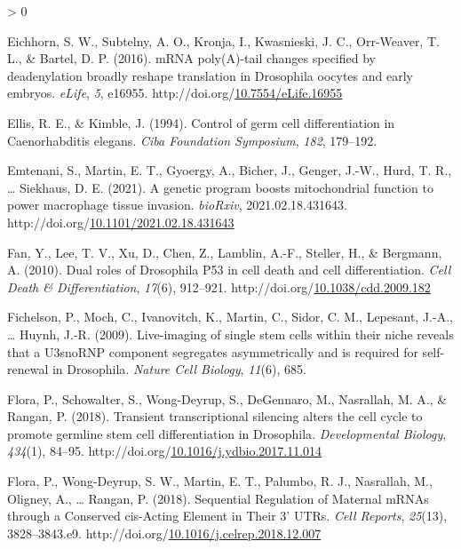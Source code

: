 \documentclass[12pt,oneside]{reedthesis}
\newlength{\cslhangindent}
\newenvironment{CSLReferences}[2] %
 {%
  \setlength{\parindent}{0pt}
  \ifodd #1 \everypar{\setlength{\hangindent}{\cslhangindent}}\ignorespaces\fi
  \ifnum #2 > 0
  \setlength{\parskip}{#2\baselineskip}
  \fi
 }%
 {}
\begin{document}
\begin{CSLReferences}{1}{0}
\leavevmode\hypertarget{ref-Eichhorn2016n}{}%
Eichhorn, S. W., Subtelny, A. O., Kronja, I., Kwasnieski, J. C., Orr-Weaver, T. L., \& Bartel, D. P. (2016). {mRNA} poly({A})-tail changes specified by deadenylation broadly reshape translation in {Drosophila} oocytes and early embryos. \emph{eLife}, \emph{5}, e16955. http://doi.org/\href{https://doi.org/10.7554/eLife.16955}{10.7554/eLife.16955}

\leavevmode\hypertarget{ref-Ellis1994d}{}%
Ellis, R. E., \& Kimble, J. (1994). Control of germ cell differentiation in {Caenorhabditis} elegans. \emph{Ciba Foundation Symposium}, \emph{182}, 179--192.

\leavevmode\hypertarget{ref-emtenaniGeneticProgramBoosts2021}{}%
Emtenani, S., Martin, E. T., Gyoergy, A., Bicher, J., Genger, J.-W., Hurd, T. R., \ldots{} Siekhaus, D. E. (2021). A genetic program boosts mitochondrial function to power macrophage tissue invasion. \emph{bioRxiv}, 2021.02.18.431643. http://doi.org/\href{https://doi.org/10.1101/2021.02.18.431643}{10.1101/2021.02.18.431643}

\leavevmode\hypertarget{ref-fanDualRolesDrosophila2010}{}%
Fan, Y., Lee, T. V., Xu, D., Chen, Z., Lamblin, A.-F., Steller, H., \& Bergmann, A. (2010). Dual roles of {Drosophila} P53 in cell death and cell differentiation. \emph{Cell Death \& Differentiation}, \emph{17}(6), 912--921. http://doi.org/\href{https://doi.org/10.1038/cdd.2009.182}{10.1038/cdd.2009.182}

\leavevmode\hypertarget{ref-Fichelson2009a}{}%
Fichelson, P., Moch, C., Ivanovitch, K., Martin, C., Sidor, C. M., Lepesant, J.-A., \ldots{} Huynh, J.-R. (2009). Live-imaging of single stem cells within their niche reveals that a {U3snoRNP} component segregates asymmetrically and is required for self-renewal in {Drosophila}. \emph{Nature Cell Biology}, \emph{11}(6), 685.

\leavevmode\hypertarget{ref-Flora2018l}{}%
Flora, P., Schowalter, S., Wong-Deyrup, S., DeGennaro, M., Nasrallah, M. A., \& Rangan, P. (2018). Transient transcriptional silencing alters the cell cycle to promote germline stem cell differentiation in {Drosophila}. \emph{Developmental Biology}, \emph{434}(1), 84--95. http://doi.org/\href{https://doi.org/10.1016/j.ydbio.2017.11.014}{10.1016/j.ydbio.2017.11.014}

\leavevmode\hypertarget{ref-Flora2018k}{}%
Flora, P., Wong-Deyrup, S. W., Martin, E. T., Palumbo, R. J., Nasrallah, M., Oligney, A., \ldots{} Rangan, P. (2018). Sequential {Regulation} of {Maternal mRNAs} through a {Conserved} cis-{Acting Element} in {Their} 3' {UTRs}. \emph{Cell Reports}, \emph{25}(13), 3828--3843.e9. http://doi.org/\href{https://doi.org/10.1016/j.celrep.2018.12.007}{10.1016/j.celrep.2018.12.007}


\end{CSLReferences}
\end{document}
